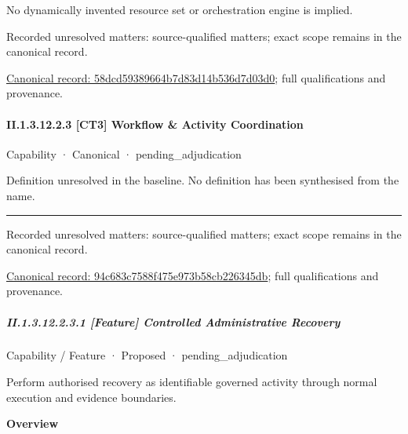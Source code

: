 No dynamically invented resource set or orchestration engine is implied.


{\small Recorded unresolved matters: source-qualified matters; exact scope remains in the canonical record.}\par
{\footnotesize \href{../../../../continuum/strategy/capability/feature/58dcd59389664b7d83d14b536d7d03d0.md}{Canonical record: 58dcd59389664b7d83d14b536d7d03d0}; full qualifications and provenance.}\par
\paragraph*{II.1.3.12.2.3 [CT3] Workflow \& Activity Coordination}
\label{navigation:II.1.3.12.2.3}

\label{element:94c683c7588f475e973b58cb226345db}
{\small Capability · Canonical · pending\_adjudication}\par

Definition unresolved in the baseline. No definition has been synthesised from the name.



\medskip\hrule\medskip

{\small Recorded unresolved matters: source-qualified matters; exact scope remains in the canonical record.}\par
{\footnotesize \href{../../../../continuum/strategy/capability/94c683c7588f475e973b58cb226345db.md}{Canonical record: 94c683c7588f475e973b58cb226345db}; full qualifications and provenance.}\par
\subparagraph*{II.1.3.12.2.3.1 [Feature] Controlled Administrative Recovery}
\label{navigation:II.1.3.12.2.3.1}

\label{element:21d0601a852043a4b0b1d4fe841108d2}
{\small Capability / Feature · Proposed · pending\_adjudication}\par

Perform authorised recovery as identifiable governed activity through normal execution and evidence boundaries.



\textbf{Overview}



